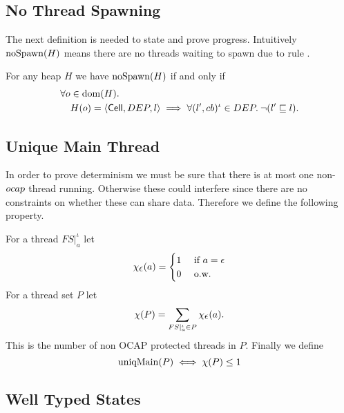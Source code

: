 \subsection{No Thread Spawning}%
\label{sub:no_thread_spawning}

The next definition is needed to state and prove progress. Intuitively
$\mbox{$\mathrm{noSpawn}$}(H)$ means there are no threads waiting to spawn due to rule
\ESpawn{}.
\begin{definition}[No Spawn]
  For any heap $H$ we have $\mbox{$\mathrm{noSpawn}$}(H)$ if and only if
  \begin{equation}
    \begin{aligned}
      \forall o &\in \mbox{$\mathrm{dom}$}(H). \\
        & H(o) = \mbox{$\langle \mbox{$\mathsf{Cell}$}{}, DEP, l \rangle$} \implies 
        \forall (l', cb)^\iota \in DEP. \: \lnot (l' \sqsubseteq l).
    \end{aligned}
  \end{equation}
\end{definition}

\subsection{Unique Main Thread}%
\label{sub:unique_main_thread}

In order to prove determinism we must be sure that there is at most one
non-$\mbox{$ocap$}$ thread running. Otherwise these could interfere since there are no
constraints on whether these can share data. Therefore we define the following
property.
\begin{definition}
  For a thread $FS|_a^\iota$ let
  \begin{equation*}
    \chi_{\mbox{$\epsilon$}}(a) =
    \begin{cases}
      1 & \text{ if } a = \mbox{$\epsilon$} \\
      0 & \text{ o.w. }
    \end{cases}
  \end{equation*}
  For a thread set $P$ let
  \begin{equation*}
    \chi(P) = \sum_{FS|_a^\iota \in P} \chi_{\mbox{$\epsilon$}}(a).
  \end{equation*}
  This is the number of non OCAP protected threads in $P$. Finally we define
  \begin{equation*}
    \mbox{$\mathrm{uniqMain}$}(P) \iff \chi(P) \leq 1
  \end{equation*}
\end{definition}


\subsection{Well Typed States}%
\label{sub:well_typed_states}

